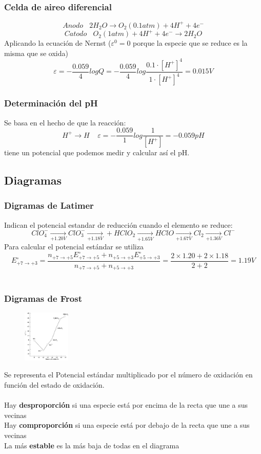\documentclass[12pt]{article}
\begin{document}
	\subsubsection{Celda de aireo diferencial}
		\[Anodo \ \ \ \ 2H_2O \longrightarrow O_2(0.1atm) + 4H^+ + 4e^- \]
	\[Catodo \ \ \ \ O_2(1atm) + 4H^+ + 4e^- \longrightarrow 2H_2O \]	
	Aplicando la ecuación de Nernst ($\varepsilon^0= 0$ porque la especie que se reduce es la misma que se oxida)
	\[\varepsilon = -\frac{0.059}{4}logQ=-\frac{0.059}{4}log\frac{0.1 \cdot [H^+]^4}{1\cdot [H^+]^4}=0.015V\]
	
	
	\subsubsection{Determinación del pH}
	Se basa en el hecho de que la reacción:
	\[H^+ \longrightarrow H  \ \ \ \ \ \varepsilon=-\frac{0.059}{1}log\frac{1}{[H^+]}=-0.059pH\]
	tiene un potencial que podemos medir y calcular así el pH.
	
	\subsection{Diagramas}
	\subsubsection{Digramas de Latimer}	
	Indican el potencial estandar de reducción cuando el elemento se reduce:
	\[ClO_4^- \xrightarrow[+1.20V]{}  ClO_3^- \xrightarrow[+1.18V]{} + HClO_2 \xrightarrow[+1.65V]{} HClO \xrightarrow[+1.67V]{}  Cl_2 \xrightarrow[+1.36V]{} Cl^-\]
	Para calcular el potencial estándar se utiliza
	\[E^{\circ}_{+7\to +3} = \frac{n_{+7 \to +5}E^{\circ}_{+7 \to +5} + n_{+5 \to +3}E^{\circ}_{+5 \to +3}}{n_{+7 \to +5} + n_{+5 \to +3}} = \frac{2\times 1.20+ 2\times 1.18}{2+2} = 1.19V\]
	\\	
	\subsubsection{Digramas de Frost}
	\begin{figure}
    	\centering
    	\includegraphics[width=0.20\textwidth]{Frost}
	\end{figure}
Se representa el Potencial estándar multiplicado por el número de oxidación en función del estado de oxidación. \\ \\
Hay \textbf{desproporción} si una especie está por encima de la recta que une a sus vecinas \\ 
Hay \textbf{comproporción} si una especie está por debajo de la recta que une a sus vecinas \\ 
La más \textbf{estable} es la más baja de todas en el diagrama
\\
\end{document}
